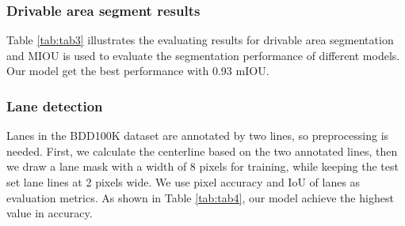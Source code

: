 \documentclass[10pt,twocolumn,letterpaper]{article}
\begin{document}
\subsubsection{Drivable area segment results}
Table \ref{tab:tab3} illustrates the evaluating results for drivable area segmentation and MIOU is used to evaluate the segmentation performance of different models. Our model get the best performance with 0.93 mIOU.  

\begin{table}[htbp]
    \footnotesize
    \begin{center}
    \end{center}
    \caption{Results on drivable area segment.}
    \label{tab:tab3}
\end{table}

\subsubsection{Lane detection}
Lanes in the BDD100K dataset are annotated by two lines, so preprocessing is needed. First, we calculate the centerline based on the two annotated lines, then we draw a lane mask with a width of 8 pixels for training, while keeping the test set lane lines at 2 pixels wide. We use pixel accuracy and IoU of lanes as evaluation metrics. As shown in Table \ref{tab:tab4}, our model achieve the highest value in accuracy.
\end{document}
